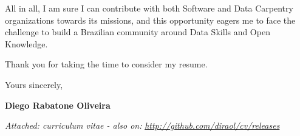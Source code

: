 \documentclass[11pt]{friggeri-cover-letter}
\begin{document}
\vfill

All in all, I am sure I can contribute with both Software and Data Carpentry
organizations towards its missions, and this opportunity eagers me to face the
challenge to build a Brazilian community around Data Skills and Open Knowledge.

\vfill

Thank you for taking the time to consider my resume.

\vfill

\hfill Yours sincerely,

\hfill \textbf{Diego Rabatone Oliveira}

\vfill

\footnotesize{\thinfont\color{lightgray}\textit{Attached: curriculum vitae - also on:} \textit{\url{http://github.com/diraol/cv/releases}}}
\end{document}
